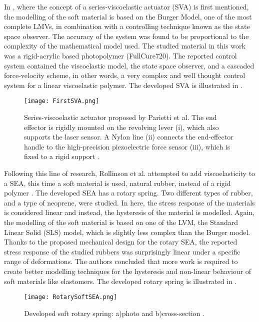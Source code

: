 In \cite{parietti2011series}, where the concept of a series-viscoelastic actuator (SVA) is first mentioned, the modelling of the soft material is based on the Burger Model, one of the most complete LMVs, in combination with a controlling technique known as the state space observer. The accuracy of the system was found to be proportional to the complexity of the mathematical model used. The studied material in this work was a rigid-acrylic based photopolymer (FullCure720). The reported control system contained the viscoelastic model, the state space observer, and a cascaded force-velocity scheme, in other words, a very complex and well thought control system for a linear viscoelastic polymer. The developed SVA is illustrated in . 

\begin{figure}[htb!]
    \centering
    \texttt{[image: FirstSVA.png]}
    \caption{Series-viscoelastic actuator proposed by Parietti et al. The end effector is rigidly mounted on the revolving lever (i), which also supports the laser sensor. A Nylon line (ii) connects the end-effector handle to the high-precision piezoelectric force sensor (iii), which is fixed to a rigid support \cite{parietti2011series}.}
    \label{fig:firstSVA}
\end{figure}

Following this line of research, Rollinson et al. attempted to add viscoelasticity to a SEA, this time a soft material is used, natural rubber, instead of a rigid polymer \cite{rollinson2013design}. The developed SEA has a rotary spring. Two different types of rubber, and a type of neoprene, were studied. In here, the stress response of the materials is considered linear and instead, the hysteresis of the material is modelled. Again, the modelling of the soft material is based on one of the LVM, the Standard Linear Solid (SLS) model, which is slightly less complex than the Burger model. Thanks to the proposed mechanical design for the rotary SEA, the reported stress response of the studied rubbers was surprisingly linear under a specific range of deformations. The authors concluded that more work is required to create better modelling techniques for the hysteresis and non-linear behaviour of soft materials like elastomers. The developed rotary spring is illustrated in .

\begin{figure}[htb!]
    \centering
    \texttt{[image: RotarySoftSEA.png]}
    \caption{Developed soft rotary spring: a)photo and b)cross-section \cite{rollinson2013design}.}
    \label{fig:rotarySoftSEA}
\end{figure}

